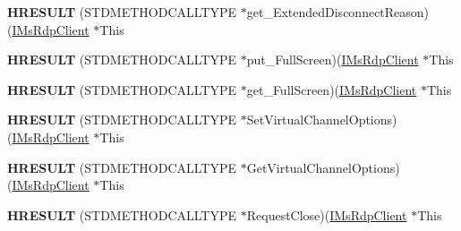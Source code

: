 \begin{DoxyCompactItemize}
\mbox{\label{struct_m_s_t_s_c_lib_1_1_i_ms_rdp_client_vtbl_af0e1644d3254a49c5dfc43bd5550a6aa}} 
{\bfseries H\+R\+E\+S\+U\+LT} (S\+T\+D\+M\+E\+T\+H\+O\+D\+C\+A\+L\+L\+T\+Y\+PE $\ast$get\+\_\+\+Extended\+Disconnect\+Reason)(\hyperlink{interface_m_s_t_s_c_lib_1_1_i_ms_rdp_client}{I\+Ms\+Rdp\+Client} $\ast$This
\item 
\mbox{\label{struct_m_s_t_s_c_lib_1_1_i_ms_rdp_client_vtbl_a0cda289a5d9f79d4040e1c330b956695}} 
{\bfseries H\+R\+E\+S\+U\+LT} (S\+T\+D\+M\+E\+T\+H\+O\+D\+C\+A\+L\+L\+T\+Y\+PE $\ast$put\+\_\+\+Full\+Screen)(\hyperlink{interface_m_s_t_s_c_lib_1_1_i_ms_rdp_client}{I\+Ms\+Rdp\+Client} $\ast$This
\item 
\mbox{\label{struct_m_s_t_s_c_lib_1_1_i_ms_rdp_client_vtbl_abc930def155aed618f8705e9875d1693}} 
{\bfseries H\+R\+E\+S\+U\+LT} (S\+T\+D\+M\+E\+T\+H\+O\+D\+C\+A\+L\+L\+T\+Y\+PE $\ast$get\+\_\+\+Full\+Screen)(\hyperlink{interface_m_s_t_s_c_lib_1_1_i_ms_rdp_client}{I\+Ms\+Rdp\+Client} $\ast$This
\item 
\mbox{\label{struct_m_s_t_s_c_lib_1_1_i_ms_rdp_client_vtbl_aff19a0756baa5ab61a5c0c3ed743e3c5}} 
{\bfseries H\+R\+E\+S\+U\+LT} (S\+T\+D\+M\+E\+T\+H\+O\+D\+C\+A\+L\+L\+T\+Y\+PE $\ast$Set\+Virtual\+Channel\+Options)(\hyperlink{interface_m_s_t_s_c_lib_1_1_i_ms_rdp_client}{I\+Ms\+Rdp\+Client} $\ast$This
\item 
\mbox{\label{struct_m_s_t_s_c_lib_1_1_i_ms_rdp_client_vtbl_a26319e26146de0355a7fa01254fd61f7}} 
{\bfseries H\+R\+E\+S\+U\+LT} (S\+T\+D\+M\+E\+T\+H\+O\+D\+C\+A\+L\+L\+T\+Y\+PE $\ast$Get\+Virtual\+Channel\+Options)(\hyperlink{interface_m_s_t_s_c_lib_1_1_i_ms_rdp_client}{I\+Ms\+Rdp\+Client} $\ast$This
\item 
\mbox{\label{struct_m_s_t_s_c_lib_1_1_i_ms_rdp_client_vtbl_a26523b94c9e5a15c89a271ab0b825053}} 
{\bfseries H\+R\+E\+S\+U\+LT} (S\+T\+D\+M\+E\+T\+H\+O\+D\+C\+A\+L\+L\+T\+Y\+PE $\ast$Request\+Close)(\hyperlink{interface_m_s_t_s_c_lib_1_1_i_ms_rdp_client}{I\+Ms\+Rdp\+Client} $\ast$This
\end{DoxyCompactItemize}

